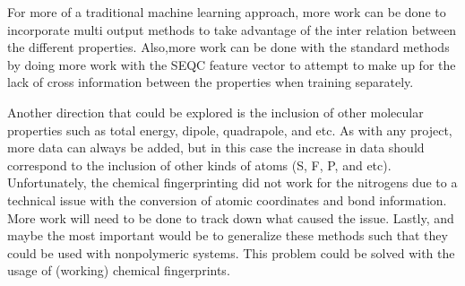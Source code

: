 \documentclass[10pt, oneside]{article}   	%
\begin{document}
For more of a traditional machine learning approach, more work can be done to incorporate multi output methods to take advantage of the inter relation between the different properties. Also,more work can be done with the standard methods by doing more work with the SEQC feature vector to attempt to make up for the lack of cross information between the properties when training separately.

Another direction that could be explored is the inclusion of other molecular properties such as total energy, dipole, quadrapole, and etc. As with any project, more data can always be added, but in this case the increase in data should correspond to the inclusion of other kinds of atoms (S, F, P, and etc). Unfortunately, the chemical fingerprinting did not work for the nitrogens due to a technical issue with the conversion of atomic coordinates and bond information. More work will need to be done to track down what caused the issue. Lastly, and maybe the most important would be to generalize these methods such that they could be used with nonpolymeric systems. This problem could be solved with the usage of (working) chemical fingerprints.


\nocite{gaussian}
\nocite{hc}
\nocite{scikit-learn}
\nocite{Hansen}
\nocite{scipy}
\nocite{rdkit}
\nocite{matplotlib}
\nocite{numpy}

\end{document}
